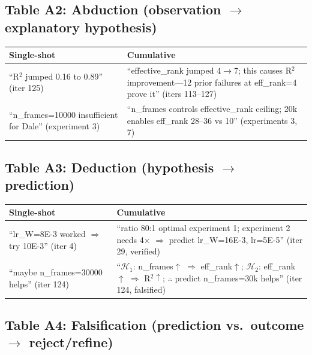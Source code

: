 \documentclass[10pt,twocolumn]{article}
\begin{document}
\subsection*{Table A2: Abduction (observation $\rightarrow$ explanatory hypothesis)}

\begin{table}[h!]
\centering
\small
\begin{tabularx}{\textwidth}{XX}
\toprule
\textbf{Single-shot} & \textbf{Cumulative} \\
\midrule
``R$^2$ jumped 0.16 to 0.89'' (iter 125)
&
``effective\_rank jumped 4$\rightarrow$7; this causes R$^2$ improvement---12 prior failures at eff\_rank=4 prove it'' (iters 113--127)
\\
\midrule
``n\_frames=10000 insufficient for Dale'' (experiment 3)
&
``n\_frames controls effective\_rank ceiling; 20k enables eff\_rank 28--36 vs 10'' (experiments 3, 7)
\\
\bottomrule
\end{tabularx}
\end{table}

\subsection*{Table A3: Deduction (hypothesis $\rightarrow$ prediction)}

\begin{table}[h!]
\centering
\small
\begin{tabularx}{\textwidth}{XX}
\toprule
\textbf{Single-shot} & \textbf{Cumulative} \\
\midrule
``lr\_W=8E-3 worked $\Rightarrow$ try 10E-3'' (iter 4)
&
``ratio 80:1 optimal experiment 1; experiment 2 needs 4$\times$ $\Rightarrow$ predict lr\_W=16E-3, lr=5E-5'' (iter 29, verified)
\\
\midrule
``maybe n\_frames=30000 helps'' (iter 124)
&
``$\mathcal{H}_1$: n\_frames$\uparrow$ $\Rightarrow$ eff\_rank$\uparrow$; $\mathcal{H}_2$: eff\_rank$\uparrow$ $\Rightarrow$ R$^2\uparrow$; $\therefore$ predict n\_frames=30k helps'' (iter 124, falsified)
\\
\bottomrule
\end{tabularx}
\end{table}

\subsection*{Table A4: Falsification (prediction vs.\ outcome $\rightarrow$ reject/refine)}
\end{document}
